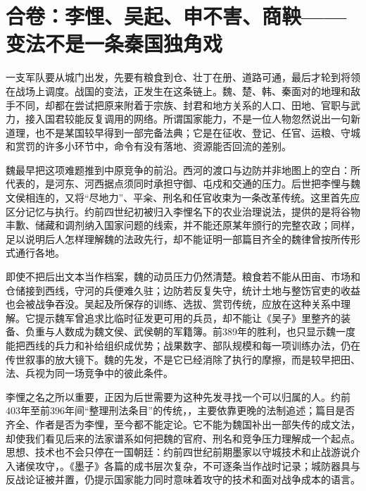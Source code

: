 \section{合卷：李悝、吴起、申不害、商鞅——变法不是一条秦国独角戏}

一支军队要从城门出发，先要有粮食到仓、壮丁在册、道路可通，最后才轮到将领在战场上调度。战国的变法，正发生在这条链上。魏、楚、韩、秦面对的地理和敌手不同，却都在尝试把原来附着于宗族、封君和地方关系的人口、田地、官职与武力，接入国君较能反复调用的网络。所谓国家能力，不是一位人物忽然说出一句新道理，也不是某国较早得到一部完备法典；它是在征收、登记、任官、运粮、守城和赏罚的许多小环节中，命令有没有落地、资源能否回流的差别。

魏最早把这项难题推到中原竞争的前沿。西河的渡口与边防并非地图上的空白：所代表的，是河东、河西据点须同时承担守御、屯戍和交通的压力。后世把李悝与魏文侯相连的，又将“尽地力”、平籴、刑名和任官收束为一条改革传统。这里首先应区分记忆与执行。约前四世纪初被归入李悝名下的农业治理说法，提供的是将谷物丰歉、储藏和调剂纳入国家问题的线索，并不能还原某年颁行的完整农政；同样，足以说明后人怎样理解魏的法政先行，却不能证明一部篇目齐全的魏律曾按所传形式通行各地。

即使不把后出文本当作档案，魏的动员压力仍然清楚。粮食若不能从田亩、市场和仓储接到西线，守河的兵便难久驻；边防若反复失守，统计土地与整饬官吏的收益也会被战争吞没。吴起及所保存的训练、选拔、赏罚传统，应放在这种关系中理解。它提示魏军曾追求比临时征发更可用的兵员，却不能让《吴子》里整齐的装备、负重与人数成为魏文侯、武侯朝的军籍簿。前389年的胜利，也只显示魏一度能把西线的兵力和补给组织成优势；战果数字、部队规模和每一项训练办法，仍在传世叙事的放大镜下。魏的先发，不是它已经消除了执行的摩擦，而是较早把田、法、兵视为同一场竞争中的彼此条件。

李悝之名之所以重要，正因为后世需要为这种先发寻找一个可以归属的人。约前403年至前396年间“整理刑法条目”的传统，，主要依靠更晚的法制追述；篇目是否齐全、作者是否为李悝，至今都不能定论。它不能为魏国补出一部失传的成文法，却使我们看见后来的法家谱系如何把魏的官府、刑名和竞争压力理解成一个起点。思想、技术也不会只停在一国朝廷：约前四世纪前期墨家以守城技术和止战游说介入诸侯攻守，。《墨子》各篇的成书层次复杂，不可逐条当作战时记录；城防器具与反战论证被并置，仍提示国家能力同时意味着攻守的技术和面对战争成本的语言。


